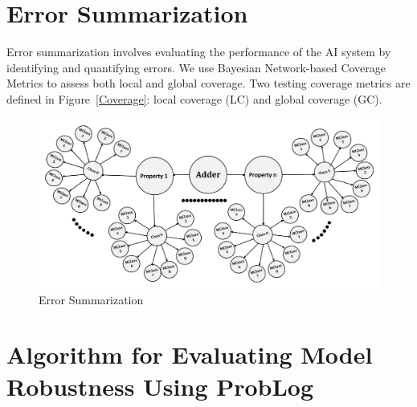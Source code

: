 


\section{Error Summarization}

Error summarization involves evaluating the performance of the AI system by identifying and quantifying errors. We use Bayesian Network-based Coverage Metrics to assess both local and global coverage. Two testing coverage metrics are defined in Figure~\ref{Coverage}: local coverage (LC) and global coverage (GC).

\begin{figure}[h]
    \centering
    \includegraphics[width=\textwidth]{figures/step5.pdf}
    \caption{Error Summarization}
    \label{Summarization}
\end{figure}



\section{Algorithm for Evaluating Model Robustness Using ProbLog}

